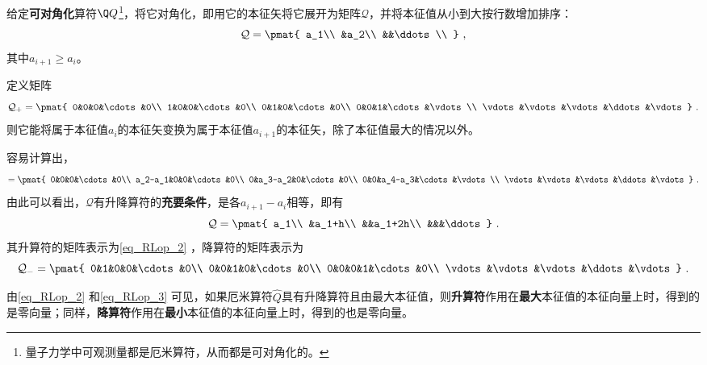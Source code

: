 给定\textbf{可对角化}算符$\Q Q$\footnote{量子力学中可观测量都是厄米算符，从而都是可对角化的。}，将它对角化，即用它的本征矢将它展开为矩阵$\mathcal{Q}$，并将本征值从小到大按行数增加排序：
\begin{equation}
\mathcal{Q}=
\pmat{
    a_1\\
    &a_2\\
    &&\ddots\\
}~,
\end{equation}
其中$a_{i+1}\geq a_i$。

定义矩阵
\begin{equation}\label{eq_RLop_2}
\mathcal{Q}_+ = 
\pmat{
    0&0&0&\cdots&0\\
    1&0&0&\cdots&0\\
    0&1&0&\cdots&0\\
    0&0&1&\cdots&\vdots\\
    \vdots&\vdots&\vdots&\ddots&\vdots
}~.
\end{equation}
则它能将属于本征值$a_i$的本征矢变换为属于本征值$a_{i+1}$的本征矢，除了本征值最大的情况以外。

容易计算出，
\begin{equation}
[\mathcal{Q}, \mathcal{Q}_+]=
\pmat{
    0&0&0&\cdots&0\\
    a_2-a_1&0&0&\cdots&0\\
    0&a_3-a_2&0&\cdots&0\\
    0&0&a_4-a_3&\cdots&\vdots\\
    \vdots&\vdots&\vdots&\ddots&\vdots
}~.
\end{equation}
由此可以看出，$\mathcal{Q}$有升降算符的\textbf{充要条件}，是各$a_{i+1}-a_i$相等，即有
\begin{equation}
\mathcal{Q}=\pmat{
    a_1\\
    &a_1+h\\
    &&a_1+2h\\
    &&&\ddots
}~.
\end{equation}
其升算符的矩阵表示为\autoref{eq_RLop_2} ，降算符的矩阵表示为
\begin{equation}\label{eq_RLop_3}
\mathcal{Q}_- = 
\pmat{
    0&1&0&0&\cdots&0\\
    0&0&1&0&\cdots&0\\
    0&0&0&1&\cdots&0\\
    \vdots&\vdots&\vdots&\ddots&\vdots
}~.
\end{equation}

由\autoref{eq_RLop_2} 和\autoref{eq_RLop_3} 可见，如果厄米算符$\hat{Q}$具有升降算符且由最大本征值，则\textbf{升算符}作用在\textbf{最大}本征值的本征向量上时，得到的是零向量；同样，\textbf{降算符}作用在\textbf{最小}本征值的本征向量上时，得到的也是零向量。






